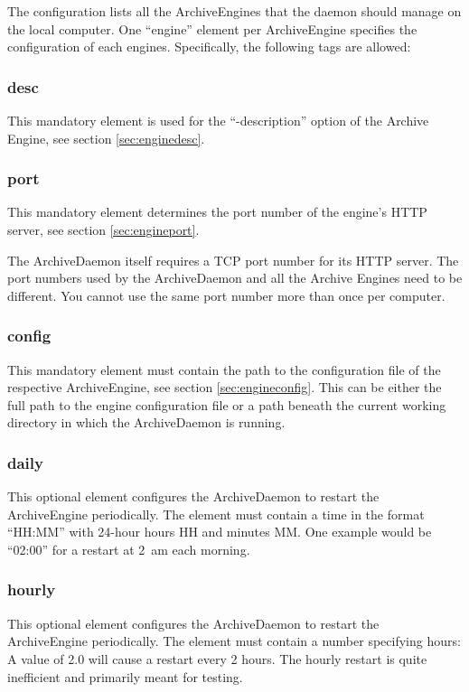 \noindent The configuration lists all the
ArchiveEngines that the daemon should manage on the local
computer. One ``engine'' element per ArchiveEngine specifies the
configuration of each engines. Specifically, the following tags are
allowed:

\subsubsection{desc}
This mandatory element is used for the ``-description'' option of the
Archive Engine, see section \ref{sec:enginedesc}.

\subsubsection{port}
This mandatory element determines the port number of the engine's HTTP
server, see section \ref{sec:engineport}.

\NOTE The ArchiveDaemon itself requires a TCP port number for its HTTP
server. The port numbers used by the ArchiveDaemon and all the Archive
Engines need to be different. You cannot use the same port number more
than once per computer.

\subsubsection{config}
This mandatory element must contain the path to the configuration
file of the respective ArchiveEngine, see section \ref{sec:engineconfig}.
This can be either the full path to the engine configuration file or a path
beneath the current working directory in which the ArchiveDaemon is running.

\subsubsection{daily}
This optional element configures the ArchiveDaemon to restart the
ArchiveEngine periodically. The element must contain a time in the
format ``HH:MM'' with 24-hour hours HH and minutes MM. One example
would be ``02:00'' for a restart at 2~am each morning.

\subsubsection{hourly}
This optional element configures the ArchiveDaemon to restart the
ArchiveEngine periodically. The element must contain a number
specifying hours: A value of 2.0 will cause a restart every 2
hours. The hourly restart is quite inefficient and primarily meant for testing.

